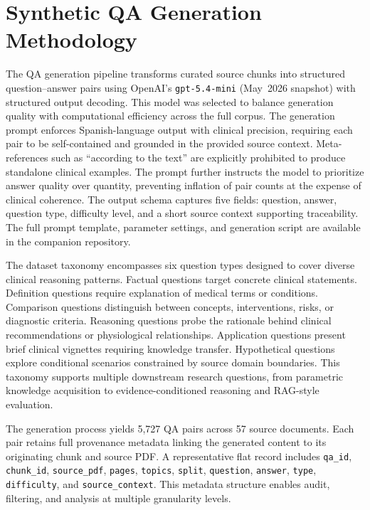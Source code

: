 \documentclass[conference]{IEEEtran}
\begin{document}
\section{Synthetic QA Generation Methodology}
The QA generation pipeline transforms curated source chunks into structured question--answer pairs using OpenAI's \texttt{gpt-5.4-mini} (May~2026 snapshot) with structured output decoding. This model was selected to balance generation quality with computational efficiency across the full corpus. The generation prompt enforces Spanish-language output with clinical precision, requiring each pair to be self-contained and grounded in the provided source context. Meta-references such as ``according to the text'' are explicitly prohibited to produce standalone clinical examples. The prompt further instructs the model to prioritize answer quality over quantity, preventing inflation of pair counts at the expense of clinical coherence. The output schema captures five fields: question, answer, question type, difficulty level, and a short source context supporting traceability. The full prompt template, parameter settings, and generation script are available in the companion repository.

The dataset taxonomy encompasses six question types designed to cover diverse clinical reasoning patterns. Factual questions target concrete clinical statements. Definition questions require explanation of medical terms or conditions. Comparison questions distinguish between concepts, interventions, risks, or diagnostic criteria. Reasoning questions probe the rationale behind clinical recommendations or physiological relationships. Application questions present brief clinical vignettes requiring knowledge transfer. Hypothetical questions explore conditional scenarios constrained by source domain boundaries. This taxonomy supports multiple downstream research questions, from parametric knowledge acquisition to evidence-conditioned reasoning and RAG-style evaluation.

The generation process yields 5,727 QA pairs across 57 source documents. Each pair retains full provenance metadata linking the generated content to its originating chunk and source PDF. A representative flat record includes \texttt{qa\_id}, \texttt{chunk\_id}, \texttt{source\_pdf}, \texttt{pages}, \texttt{topics}, \texttt{split}, \texttt{question}, \texttt{answer}, \texttt{type}, \texttt{difficulty}, and \texttt{source\_context}. This metadata structure enables audit, filtering, and analysis at multiple granularity levels.
\end{document}
